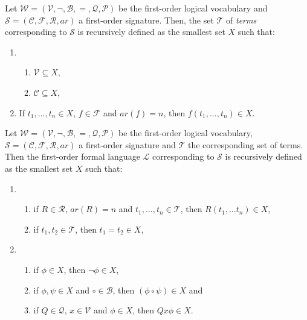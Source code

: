 \begin{definition}
    Let $\mathcal{W} = (\mathcal{V},\neg,\mathcal{B},=,\mathcal{Q},\mathcal{P})$ be the first-order logical vocabulary and $\mathcal{S} = (\mathcal{C},\mathcal{F},\mathcal{R},ar)$ a first-order signature. Then, the set $\mathcal{T}$ of \textit{terms} corresponding to $\mathcal{S}$ is recursively defined as the smallest set $X$ such that:
    \begin{enumerate}
        \item \begin{enumerate}
            \item $\mathcal{V} \subseteq X$,
            \item $\mathcal{C} \subseteq X$,
        \end{enumerate}
        \item If $t_1,...,t_n \in X$, $f \in \mathcal{F}$ and $ar(f) = n$, then $f(t_1,...,t_n) \in X$.
    \end{enumerate}
\end{definition}

\begin{definition}
    Let $\mathcal{W} = (\mathcal{V},\neg,\mathcal{B},=,\mathcal{Q},\mathcal{P})$ be the first-order logical vocabulary, $\mathcal{S} = (\mathcal{C},\mathcal{F},\mathcal{R},ar)$ a first-order signature and $\mathcal{T}$ the corresponding set of terms. Then the first-order formal language $\mathcal{L}$ corresponding to $\mathcal{S}$ is recursively defined as the smallest set $X$ such that:
    \begin{enumerate}
        \item \begin{enumerate}
            \item if $R \in \mathcal{R}$, $ar(R) = n$ and $t_1,...,t_n \in \mathcal{T}$, then $R(t_1,...t_n) \in X$,
            \item if $t_1,t_2 \in \mathcal{T}$, then $t_1 = t_2 \in X$, 
        \end{enumerate}
        \item \begin{enumerate}
            \item if $\phi \in X$, then $\neg \phi \in X$,
            \item if $\phi, \psi \in X$ and $\circ \in \mathcal{B}$, then $(\phi \circ \psi) \in X$ and
            \item if $Q \in \mathcal{Q}$, $x \in \mathcal{V}$ and $\phi \in X$, then $Qx\phi \in X$.
        \end{enumerate}
    \end{enumerate}
\end{definition}

